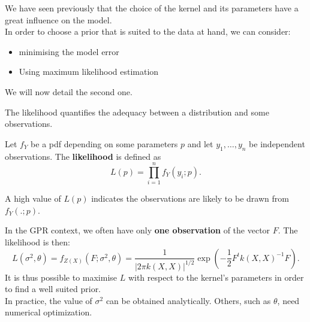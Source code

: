 \documentclass{beamer}
\begin{document}
\begin{frame}{}
We have seen previously that the choice of the kernel and its parameters have a great influence on the model. \\ \vspace{5mm}
In order to choose a prior that is suited to the data at hand, we can consider:
\begin{itemize}
  \item minimising the model error
  \item Using maximum likelihood estimation 
\end{itemize}
We will now detail the second one.
\end{frame}

\begin{frame}{}
The likelihood quantifies the adequacy between a distribution and some observations. 
\begin{definition}
Let $f_Y$ be a pdf depending on some parameters $p$ and let $y_1,\dots,y_n$ be independent observations. The \textbf{likelihood} is defined as 
\begin{equation*}
  L(p) = \prod_{i=1}^n f_Y(y_i;p).
\end{equation*} 
\end{definition}
A high value of $L(p)$ indicates the observations are likely to be drawn from $f_Y(.;p)$.
\end{frame}

\begin{frame}{}
In the GPR context, we often have only \textbf{one observation} of the vector $F$. The likelihood is then:
\footnotesize
\begin{equation*}
  L(\sigma^2,\theta)= f_{Z(X)}(F;\sigma^2,\theta) = \frac{1}{\displaystyle | 2 \pi k(X,X)|^{1/2}} \exp \left(-\frac12 F^t k(X,X)^{-1} F  \right).
\end{equation*} 
\normalsize
It is thus possible to maximise $L$  with respect to the kernel's parameters in order to find a well suited prior.\\
\vspace{5mm}
In practice, %
the value of $\sigma^2$ can be obtained analytically. Others, such as $\theta$, need numerical optimization.
\end{frame}
\end{document}
